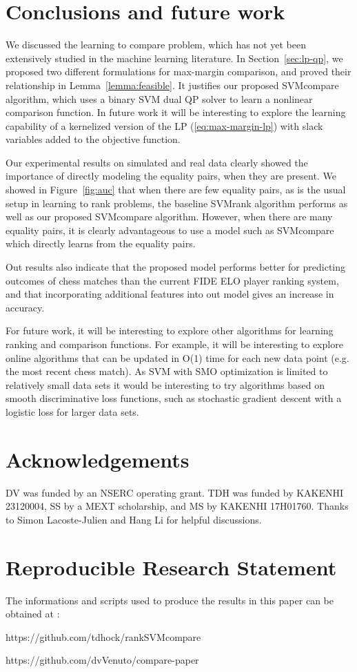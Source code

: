 \documentclass[twoside,11pt]{article}
\newcommand{\changed}[1]{
  #1
}
\begin{document}
\section{Conclusions and future work}
\label{sec:conclusions}

We discussed the learning to compare problem, which has not yet been
extensively studied in the machine learning literature. In
Section~\ref{sec:lp-qp}, we proposed two different formulations for
max-margin comparison, and proved their relationship in
Lemma~\ref{lemma:feasible}. It justifies our proposed SVMcompare
algorithm, which uses a binary SVM dual QP solver to learn a nonlinear
comparison function. \changed{In future work it will be interesting to explore
the learning capability of a kernelized version of the LP
(\ref{eq:max-margin-lp}) with slack variables added to the objective
function.}

Our experimental results on simulated and real data clearly showed the
importance of directly modeling the equality pairs, when they are
present. We showed in Figure~\ref{fig:auc} that when there are few
equality pairs, as is the usual setup in learning to rank problems,
the baseline SVMrank algorithm performs as well as our proposed
SVMcompare algorithm. However, when there are many equality pairs, it
is clearly advantageous to use a model such as SVMcompare which
directly learns from the equality pairs.

Out results also indicate that the proposed model performs better for
predicting outcomes of chess matches than the current FIDE ELO player
ranking system, and that incorporating additional features into out
model gives an increase in accuracy.

For future work, it will be interesting to explore other algorithms for learning ranking and comparison functions. For example, it will be interesting to explore online algorithms that can be updated in O(1) time for each new data point (e.g. the most recent chess match).  As SVM with SMO optimization is limited to relatively small data sets it would be interesting to try algorithms based on
smooth discriminative loss functions, such as stochastic gradient descent with a logistic loss for larger data sets.


\section*{Acknowledgements}
DV was funded by an NSERC operating grant. TDH was funded by KAKENHI 23120004, SS by a
MEXT scholarship, and MS by KAKENHI 17H01760. 
Thanks to Simon Lacoste-Julien and Hang Li for helpful discussions.

\section*{Reproducible Research Statement}
The informations and scripts used to produce the results in this paper can be obtained at :

https://github.com/tdhock/rankSVMcompare

https://github.com/dvVenuto/compare-paper




\end{document}
